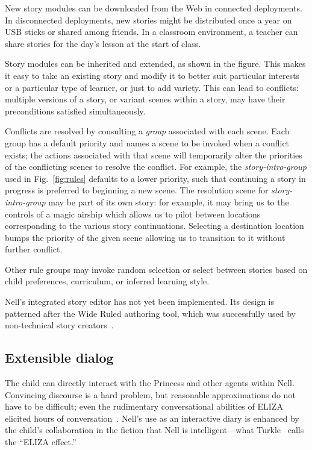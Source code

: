 \documentclass[preprint]{sig-alternate}
\begin{document}

New story modules can be downloaded from the Web in
connected deployments.  In disconnected deployments, new stories
might be distributed once a year on USB sticks or shared among
friends.  In a classroom environment, a teacher can share stories for
the day's lesson at the start of class.

Story modules can be inherited and extended, as shown in the figure.
This makes it easy to take an existing story and modify it to
better suit particular interests or a particular type of learner, or
just to add variety.  This can lead to conflicts: multiple versions of
a story, or variant scenes within a story, may have their
preconditions satisfied simultaneously.

Conflicts are resolved by consulting a \textit{group} associated with
each scene.  Each group has a default priority and names a scene to be
invoked when a conflict exists; the actions associated with that scene
will temporarily alter the priorities of the conflicting scenes to
resolve the conflict.  For example, the \textit{story-intro-group}
used in Fig.~\ref{fig:rules} defaults to a lower priority, such that
continuing a story in progress is preferred to beginning a new scene.
The resolution scene for \textit{story-intro-group} may be part of its
own story: for example, it may bring us to the controls of a magic airship
which allows us to pilot between locations corresponding to the
various story continuations.  Selecting a destination location bumps
the priority of the given scene allowing us to transition to it
without further conflict.

Other rule groups may invoke random selection or select between stories
based on child preferences, curriculum, or inferred learning style.

Nell's integrated story editor has not yet been implemented.  Its
design is patterned after the Wide Ruled authoring tool, which was
successfully used by non-technical story creators~\cite{skorupski:2009}.


\subsection{Extensible dialog}
The child can directly interact with the Princess and other agents within
Nell.  Convincing discourse is a hard problem, but
reasonable approximations do not have to be difficult; even
the rudimentary conversational abilities of ELIZA elicited hours of
conversation~\cite{weizenbaum:power}.
Nell's use as an interactive diary is enhanced by the child's
collaboration in the fiction that Nell is intelligent---what
Turkle~\cite{turkle:alone} calls the ``ELIZA effect.''
\end{document}
